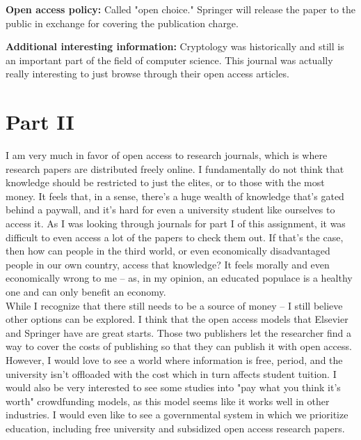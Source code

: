 \documentclass[a4paper,11pt]{article}
\begin{document}
\textbf{Open access policy:} Called "open choice." Springer will release the paper to the public in exchange for covering the publication charge.

\textbf{Additional interesting information:} Cryptology was historically and still is an important part of the field of computer science. This journal was actually really interesting to just browse through their open access articles.


\section*{Part II}\n

I am very much in favor of open access to research journals, which is where research papers are distributed freely online. I fundamentally do not think that knowledge should be restricted to just the elites, or to those with the most money. It feels that, in a sense, there's a huge wealth of knowledge that's gated behind a paywall, and it's hard for even a university student like ourselves to access it. As I was looking through journals for part I of this assignment, it was difficult to even access a lot of the papers to check them out. If that's the case, then how can people in the third world, or even economically disadvantaged people in our own country, access that knowledge? It feels morally and even economically wrong to me -- as, in my opinion, an educated populace is a healthy one and can only benefit an economy.\\

While I recognize that there still needs to be a source of money -- I still believe other options can be explored. I think that the open access models that Elsevier and Springer have are great starts. Those two publishers let the researcher find a way to cover the costs of publishing so that they can publish it with open access. However, I would love to see a world where information is free, period, and the university isn't offloaded with the cost which in turn affects student tuition. I would also be very interested to see some studies into "pay what you think it's worth" crowdfunding models, as this model seems like it works well in other industries. I would even like to see a governmental system in which we prioritize education, including free university and subsidized open access research papers.\\
\end{document}
